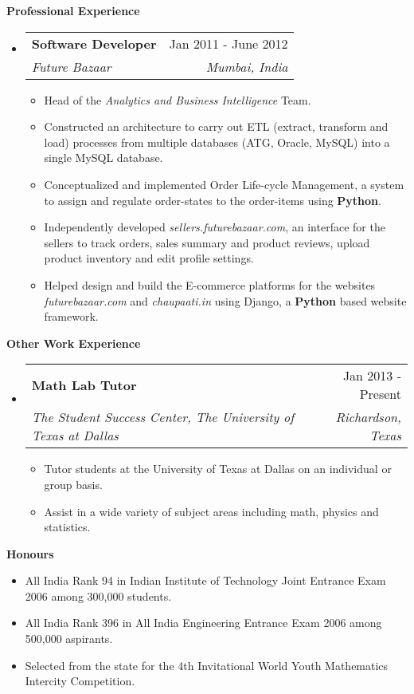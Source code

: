 \documentclass[letterpaper,11pt]{article}
\makeatletter
\newcommand{\resitem}[1]{\item[\ding{226}] #1 \vspace{-2pt}}
\newcommand{\resheading}[1]{{\large \colorbox{mygrey}{\begin{minipage}{\textwidth}{\textbf{#1 \vphantom{p\^{E}}}}\end{minipage}}}}
\newcommand{\ressubheading}[4]{
\begin{tabular*}{7.0in}{l@{\extracolsep{\fill}}r}
		\textbf{#1} & #2 \\
		\textit{#3} & \textit{#4} \\
\end{tabular*}\vspace{-6pt}}
\makeatother
\begin{document}
\resheading{Professional Experience}
\begin{itemize}
\item
	\ressubheading{Software Developer}{Jan 2011 - June 2012}{Future Bazaar}{Mumbai, India}
	\begin{itemize}
		\resitem{Head of the \textit{Analytics and Business Intelligence} Team. }
		\resitem{Constructed an architecture to carry out ETL (extract, transform and load) processes from multiple databases (ATG, Oracle, MySQL) into a single MySQL database.}
		\resitem{Conceptualized and implemented Order Life-cycle Management, a system to assign and regulate order-states to the order-items using \textbf{Python}.}
		\resitem{Independently developed \textit{sellers.futurebazaar.com}, an interface for the sellers to track orders, sales summary and product reviews, upload product inventory and edit profile settings.}
		\resitem{Helped design and build the E-commerce platforms for the websites \textit{futurebazaar.com} and \textit{chaupaati.in} using Django, a \textbf{Python} based website framework.}
	\end{itemize}
\end{itemize}

\resheading{Other Work Experience}
\begin{itemize}

\item
	\ressubheading{Math Lab Tutor}{Jan 2013 - Present}{The Student Success Center, The University of Texas at Dallas}{Richardson, Texas} 
	\begin{itemize}
		\resitem{Tutor students at the University of Texas at Dallas on an individual or group basis.}
        \resitem{Assist in a wide variety of subject areas including math, physics and statistics.}
	\end{itemize}

\end{itemize}

\resheading{Honours}
\begin{itemize}

\item{All India Rank 94 in Indian Institute of Technology Joint Entrance Exam 2006 among 300,000 students.}
\item{All India Rank 396 in All India Engineering Entrance Exam 2006 among 500,000 aspirants.}
\item{Selected from the state for the 4th Invitational World Youth Mathematics Intercity Competition.}

\end{itemize}
\end{document}
